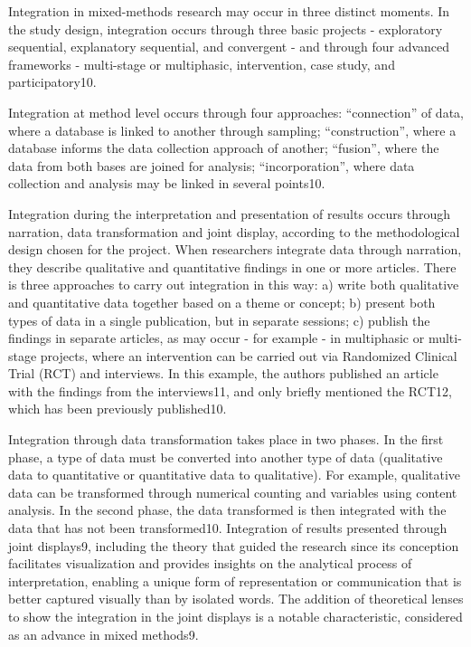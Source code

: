 Integration in mixed-methods research may occur in three distinct moments. In the study design, integration occurs through three basic projects - exploratory sequential, explanatory sequential, and convergent - and through four advanced frameworks - multi-stage or multiphasic, intervention, case study, and participatory10.

Integration at method level occurs through four approaches: “connection” of data, where a database is linked to another through sampling; “construction”, where a database informs the data collection approach of another; “fusion”, where the data from both bases are joined for analysis; “incorporation”, where data collection and analysis may be linked in several points10.

Integration during the interpretation and presentation of results occurs through narration, data transformation and joint display, according  to the methodological design chosen for the project. When researchers integrate data through narration, they describe qualitative and quantitative findings in one or more articles. There is three approaches to carry out integration in this way: a) write both qualitative and quantitative data together based on a theme or concept; b) present both types of data in a single publication, but in separate sessions; c) publish the findings  in separate articles, as may occur - for example - in multiphasic or multi-stage projects, where an intervention can be carried out via Randomized Clinical Trial (RCT) and interviews. In this example, the authors published an article with the findings from the interviews11, and only briefly mentioned the RCT12, which has been previously published10.

Integration through data transformation takes place in two phases. In the first phase, a type of data must be converted into another type of data (qualitative data to quantitative or quantitative data to qualitative). For example, qualitative data can be transformed through numerical counting and variables using content analysis. In the second phase, the data transformed is then integrated with the data that has not been transformed10. Integration of results presented through joint displays9, including the theory that guided the research since its conception facilitates visualization and provides insights on the analytical process of interpretation, enabling a unique form of representation or communication that is better captured visually than by isolated words. The addition of theoretical lenses to show  the integration in the joint displays is a notable characteristic, considered as an advance in mixed methods9.


